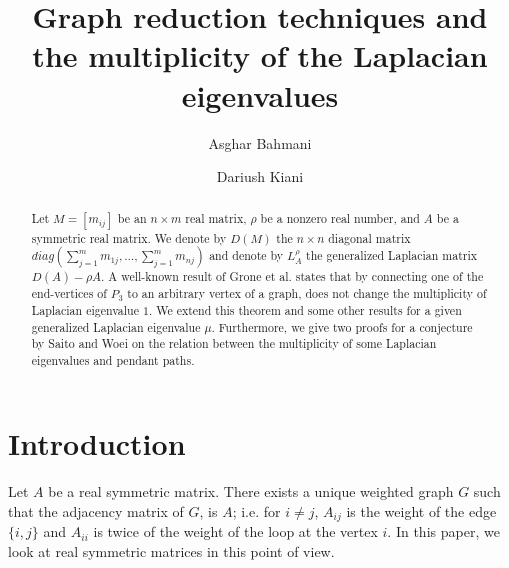 \documentclass{amsart}
\theoremstyle{remark}
\begin{document}
\title[Graph reduction techniques and the multiplicity of the Laplacian eigenvalues]{Graph reduction techniques and\\ the multiplicity of the Laplacian eigenvalues}%

\author{Asghar Bahmani}
\address{Department of Mathematics and Computer Science, Amirkabir University of Technology, 424, Hafez Ave., Tehran 15914, Iran.}
\author{Dariush Kiani}
\address{Department of Mathematics and Computer Science, Amirkabir University of Technology, 424, Hafez Ave., Tehran 15914, Iran, and School of Mathematics, Institute for Research in Fundamental Sciences (IPM), P.O. Box 19395-5746, Tehran, Iran.}

%


\begin{abstract}
Let $M=[m_{ij}]$ be an $n\times m$ real matrix, $\rho$ be a nonzero real number, and $A$ be a symmetric real matrix. We denote by $D(M)$ the $n\times n$ diagonal matrix $diag(\sum_{j=1}^{m}m_{1j},\ldots,\sum_{j=1}^{m}m_{nj})$ and denote by $L_{A}^{\rho}$ the generalized Laplacian matrix $D(A)-\rho A$.
A well-known result of Grone et al. states that by connecting one of the end-vertices of $P_{3}$ to an arbitrary vertex of a graph, does not change the multiplicity of Laplacian eigenvalue $1$. 
We extend this theorem and some other results for a given generalized Laplacian eigenvalue $\mu$.
 Furthermore, we give two proofs for a conjecture by Saito and Woei on the relation between the multiplicity of some Laplacian eigenvalues and pendant paths.
\end{abstract}
\maketitle
\section{Introduction}


Let $A$ be a real symmetric matrix. There exists a unique weighted graph $G$ such that the adjacency matrix of $G$, is $A$; i.e. for $i\neq j$, $A_{ij}$ is the weight of the edge $\{i,j\}$ and $A_{ii}$ is  twice of the weight of the loop at the vertex $i$.  In this paper, we look at real symmetric matrices in this point of view. 
\end{document}
